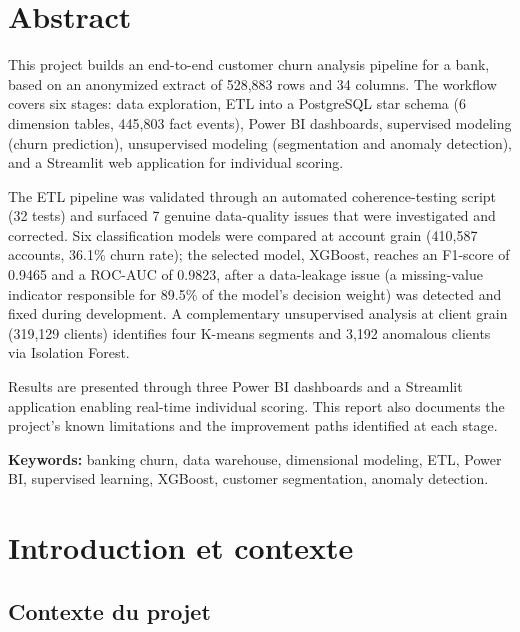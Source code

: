 \documentclass[11pt,a4paper]{report}
\begin{document}
\chapter*{Abstract}

This project builds an end-to-end customer churn analysis pipeline for a bank,
based on an anonymized extract of 528,883 rows and 34 columns. The workflow
covers six stages: data exploration, ETL into a PostgreSQL star schema
(6 dimension tables, 445,803 fact events), Power BI dashboards, supervised
modeling (churn prediction), unsupervised modeling (segmentation and anomaly
detection), and a Streamlit web application for individual scoring.

The ETL pipeline was validated through an automated coherence-testing script
(32 tests) and surfaced 7 genuine data-quality issues that were investigated
and corrected. Six classification models were compared at account grain
(410,587 accounts, 36.1\% churn rate); the selected model, XGBoost, reaches an
F1-score of 0.9465 and a ROC-AUC of 0.9823, after a data-leakage issue (a
missing-value indicator responsible for 89.5\% of the model's decision weight)
was detected and fixed during development. A complementary unsupervised
analysis at client grain (319,129 clients) identifies four K-means segments
and 3,192 anomalous clients via Isolation Forest.

Results are presented through three Power BI dashboards and a Streamlit
application enabling real-time individual scoring. This report also documents
the project's known limitations and the improvement paths identified at each
stage.

\textbf{Keywords:} banking churn, data warehouse, dimensional modeling, ETL,
Power BI, supervised learning, XGBoost, customer segmentation, anomaly
detection.

\newpage
\tableofcontents
\newpage

\chapter{Introduction et contexte}

\section{Contexte du projet}
\end{document}
